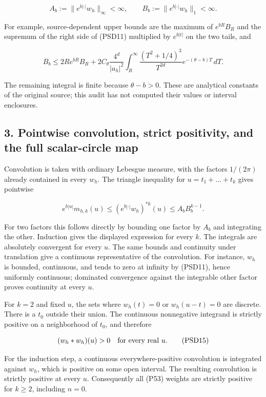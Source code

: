 \[
A_b:=\|e^{b|\cdot|}w_h\|_\infty<\infty,
\qquad B_b:=\|e^{b|\cdot|}w_h\|_1<\infty.
\tag{PSD12}
\]

For example, source-dependent upper bounds are the maximum of \(e^{bR}B_R\) and the supremum of the right side of (PSD11) multiplied by \(e^{b|t|}\) on the two tails, and

\[
B_b\le 2Re^{bR}B_R+
2C_\theta\frac{4^d}{|a_h|^2}
\int_R^\infty\frac{(T^2+1/4)^3}{T^{2d}}
e^{-(\theta-b)T}\,dT.
\tag{PSD13}
\]

The remaining integral is finite because \(\theta-b>0\). These are analytical constants of the original source; this audit has not computed their values or interval enclosures.

\subsection{3. Pointwise convolution, strict positivity, and the full scalar-circle map}\label{GraphV2:pointwise-convolution-strict-positivity-and-the-full-scalar-circle-map}

Convolution is taken with ordinary Lebesgue measure, with the factors \(1/(2\pi)\) already contained in every \(w_h\). The triangle inequality for \(u=t_1+\ldots+t_k\) gives pointwise

\[
e^{b|u|}m_{h,k}(u)
\le(e^{b|\cdot|}w_h)^{*k}(u)
\le A_bB_b^{k-1}.
\tag{PSD14}
\]

For two factors this follows directly by bounding one factor by \(A_b\) and integrating the other. Induction gives the displayed expression for every \(k\). The integrals are absolutely convergent for every \(u\). The same bounds and continuity under translation give a continuous representative of the convolution. For instance, \(w_h\) is bounded, continuous, and tends to zero at infinity by (PSD11), hence uniformly continuous; dominated convergence against the integrable other factor proves continuity at every \(u\).

For \(k=2\) and fixed \(u\), the sets where \(w_h(t)=0\) or \(w_h(u-t)=0\) are discrete. There is a \(t_0\) outside their union. The continuous nonnegative integrand is strictly positive on a neighborhood of \(t_0\), and therefore

\[
(w_h*w_h)(u)>0\quad\hbox{for every real }u.
\tag{PSD15}
\]

For the induction step, a continuous everywhere-positive convolution is integrated against \(w_h\), which is positive on some open interval. The resulting convolution is strictly positive at every \(u\). Consequently all (P53) weights are strictly positive for \(k\ge 2\), including \(n=0\).

